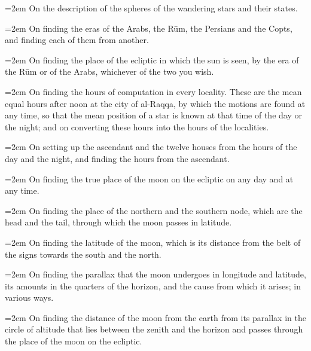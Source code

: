 \documentclass[11pt]{article}
\begin{document}
\par\noindent\hangindent=2em On the description of the spheres of the wandering stars and their states.\par
\par\noindent\hangindent=2em On finding the eras of the Arabs, the Rūm, the Persians and the Copts, and finding each of them from another.\par
\par\noindent\hangindent=2em On finding the place of the ecliptic in which the sun is seen, by the era of the Rūm or of the Arabs, whichever of the two you wish.\par
\par\noindent\hangindent=2em On finding the hours of computation in every locality. These are the mean equal hours after noon at the city of al-Raqqa, by which the motions are found at any time, so that the mean position of a star is known at that time of the day or the night; and on converting these hours into the hours of the localities.\par
\par\noindent\hangindent=2em On setting up the ascendant and the twelve houses from the hours of the day and the night, and finding the hours from the ascendant.\par
\par\noindent\hangindent=2em On finding the true place of the moon on the ecliptic on any day and at any time.\par
\par\noindent\hangindent=2em On finding the place of the northern and the southern node, which are the head and the tail, through which the moon passes in latitude.\par
\par\noindent\hangindent=2em On finding the latitude of the moon, which is its distance from the belt of the signs towards the south and the north.\par
\par\noindent\hangindent=2em On finding the parallax that the moon undergoes in longitude and latitude, its amounts in the quarters of the horizon, and the cause from which it arises; in various ways.\par
\par\noindent\hangindent=2em On finding the distance of the moon from the earth from its parallax in the circle of altitude that lies between the zenith and the horizon and passes through the place of the moon on the ecliptic.\par
\end{document}
